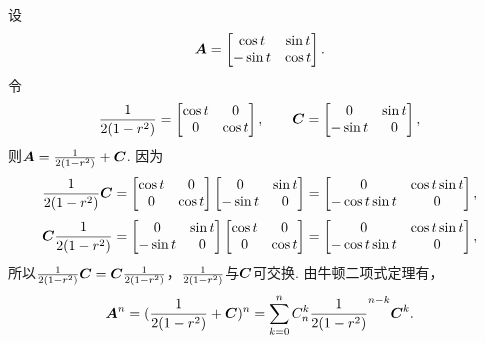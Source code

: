 \begin{example}
设\[
\boldsymbol{A} = \begin{bmatrix}
\cos t & \sin t \\
-\sin t & \cos t
\end{bmatrix}.
\]令\[
\frac{1}{2(1-r^2)} = \begin{bmatrix}
\cos t & 0 \\
0 & \cos t
\end{bmatrix}, \qquad
\boldsymbol{C} = \begin{bmatrix}
0 & \sin t \\
-\sin t & 0
\end{bmatrix},
\]则\(\boldsymbol{A}=\frac{1}{2(1-r^2)}+\boldsymbol{C}\).
因为\[
\frac{1}{2(1-r^2)}\boldsymbol{C} = \begin{bmatrix}
\cos t & 0 \\
0 & \cos t
\end{bmatrix} \begin{bmatrix}
0 & \sin t \\
-\sin t & 0
\end{bmatrix} = \begin{bmatrix}
0 & \cos t \sin t \\
-\cos t \sin t & 0
\end{bmatrix},
\]\[
\boldsymbol{C}\frac{1}{2(1-r^2)} = \begin{bmatrix}
0 & \sin t \\
-\sin t & 0
\end{bmatrix} \begin{bmatrix}
\cos t & 0 \\
0 & \cos t
\end{bmatrix} = \begin{bmatrix}
0 & \cos t \sin t \\
-\cos t \sin t & 0
\end{bmatrix},
\]所以\(\frac{1}{2(1-r^2)}\boldsymbol{C}=\boldsymbol{C}\frac{1}{2(1-r^2)}\)，\(\frac{1}{2(1-r^2)}\)与\(\boldsymbol{C}\)可交换.
由牛顿二项式定理有，\[
\boldsymbol{A}^n=(\frac{1}{2(1-r^2)}+\boldsymbol{C})^n
=\sum\limits_{k=0}^n C_n^k \frac{1}{2(1-r^2)}^{n-k} \boldsymbol{C}^k.
\]
\end{example}

